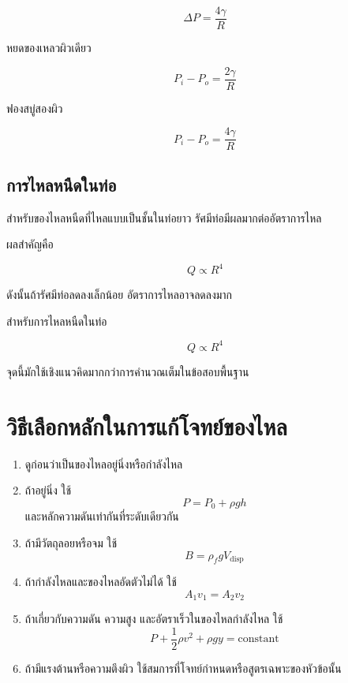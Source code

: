 \[
\Delta P=\frac{4\gamma}{R}
\]

\begin{tcolorbox}[title=ความดันเกินจากความตึงผิว]
หยดของเหลวผิวเดียว

\[
P_i-P_o=\frac{2\gamma}{R}
\]

ฟองสบู่สองผิว

\[
P_i-P_o=\frac{4\gamma}{R}
\]
\end{tcolorbox}

\subsection{การไหลหนืดในท่อ}

สำหรับของไหลหนืดที่ไหลแบบเป็นชั้นในท่อยาว รัศมีท่อมีผลมากต่ออัตราการไหล

ผลสำคัญคือ

\[
Q\propto R^4
\]

ดังนั้นถ้ารัศมีท่อลดลงเล็กน้อย อัตราการไหลอาจลดลงมาก

\begin{tcolorbox}[title=แนวคิดจากการไหลหนืด]
สำหรับการไหลหนืดในท่อ

\[
Q\propto R^4
\]

จุดนี้มักใช้เชิงแนวคิดมากกว่าการคำนวณเต็มในข้อสอบพื้นฐาน
\end{tcolorbox}

\section{วิธีเลือกหลักในการแก้โจทย์ของไหล}

\begin{tcolorbox}[title=ขั้นตอนแก้โจทย์ของไหล]
\begin{enumerate}
    \item ดูก่อนว่าเป็นของไหลอยู่นิ่งหรือกำลังไหล
    \item ถ้าอยู่นิ่ง ใช้
    \[
    P=P_0+\rho gh
    \]
    และหลักความดันเท่ากันที่ระดับเดียวกัน
    \item ถ้ามีวัตถุลอยหรือจม ใช้
    \[
    B=\rho_f gV_{\text{disp}}
    \]
    \item ถ้ากำลังไหลและของไหลอัดตัวไม่ได้ ใช้
    \[
    A_1v_1=A_2v_2
    \]
    \item ถ้าเกี่ยวกับความดัน ความสูง และอัตราเร็วในของไหลกำลังไหล ใช้
    \[
    P+\frac{1}{2}\rho v^2+\rho gy=\text{constant}
    \]
    \item ถ้ามีแรงต้านหรือความตึงผิว ใช้สมการที่โจทย์กำหนดหรือสูตรเฉพาะของหัวข้อนั้น
\end{enumerate}
\end{tcolorbox}

